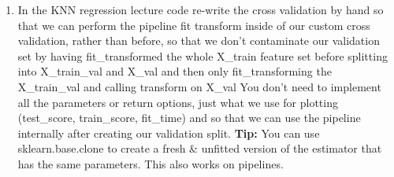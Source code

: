 \documentclass[USenglish,final,authoryear,12pt]{article}
\begin{document}
\begin{enumerate}
	\item In the KNN regression lecture code re-write the cross validation by hand so that we can perform the pipeline fit transform inside of our custom cross validation, rather than before, so that we don’t contaminate our validation set by having fit\_transformed the whole X\_train feature set before splitting into X\_train\_val and X\_val and then only fit\_transforming the X\_train\_val and calling transform on X\_val\newline\linebreak
	You don't need to implement all the parameters or return options, just what we use for plotting (test\_score, train\_score, fit\_time) and so that we can use the pipeline internally after creating our validation split.\newline\linebreak
	\textbf{Tip:} You can use sklearn.base.clone to create a fresh \& unfitted version of the estimator that has the same parameters. This also works on pipelines.
\end{enumerate}
\end{document}
